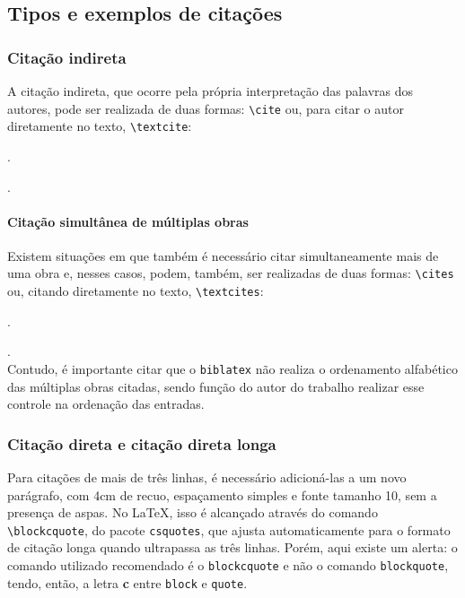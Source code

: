 \subsection{Tipos e exemplos de citações}
\subsubsection{Citação indireta}
A citação indireta, que ocorre pela própria interpretação das palavras dos autores, pode ser realizada de duas formas: \verb|\cite| ou, para citar o autor diretamente no texto, \verb|\textcite|:

  \cite{livro:dom-casmurro}.

  \textcite{livro:dom-casmurro}.

\paragraph{Citação simultânea de múltiplas obras}
Existem situações em que também é necessário citar simultaneamente mais de uma obra e, nesses casos, podem, também, ser realizadas de duas formas: \verb|\cites| ou, citando diretamente no texto, \verb|\textcites|:

\cites{site:iffar-identidade-visual-2021}{livro:dom-casmurro}.

\textcites{site:iffar-identidade-visual-2021}{livro:dom-casmurro}.\\

Contudo, é importante citar que o \verb|biblatex| não realiza o ordenamento alfabético das múltiplas obras citadas, sendo função do autor do trabalho realizar esse controle na ordenação das entradas.

\subsubsection{Citação direta e citação direta longa}
Para citações de mais de três linhas, é necessário adicioná-las a um novo parágrafo, com 4cm de recuo, espaçamento simples e fonte tamanho 10, sem a presença de aspas. No \LaTeX, isso é alcançado através do comando \verb|\blockcquote|, do pacote \verb|csquotes|, que ajusta automaticamente para o formato de citação longa quando ultrapassa as três linhas. Porém, aqui existe um alerta: o comando utilizado recomendado é o \texttt{blockcquote} e não o comando \texttt{blockquote}, tendo, então, a letra \textbf{c} entre \texttt{block} e \texttt{quote}.

